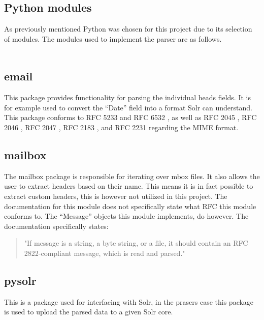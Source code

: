\documentclass[a4paper,english]{report}
\begin{document}
\subsection{Python modules}

As previously mentioned Python was chosen for this project due to its selection of modules. The modules used to implement the parser are as follows.\\\\
\noindent
\subsection{email}
This package provides functionality for parsing the individual heads fields. It is for example used to convert the “Date” field into a format Solr can understand. This package conforms to  RFC 5233 \cite{RFC5322}and RFC 6532  \cite{RFC6532}, as well as RFC 2045 \cite{RFC2045}, RFC 2046 \cite{RFC2046}, RFC 2047 \cite{RFC2047}, RFC 2183 \cite{RFC2183}, and RFC 2231 \cite{RFC2231} regarding the MIME format.\\

\noindent
\subsection{mailbox}
\noindent
The mailbox package is responsible for iterating over mbox files. It also allows the user to extract headers based on their name. This means it is in fact possible to extract custom headers, this is however not utilized in this project. The documentation for this module does not specifically state what RFC this module conforms to. The “Message” objects this module implements, do however. The documentation specifically states:\\


\begin{quotation}
"If message is a string, a byte string, or a file, it should contain an RFC 2822-compliant \cite{RFC2822} message, which is read and parsed."\\

\end{quotation}

\noindent
\subsection{pysolr} 
This is a package used for interfacing with Solr, in the prasers case this package is used to upload the parsed data to a given Solr core.
\end{document}
